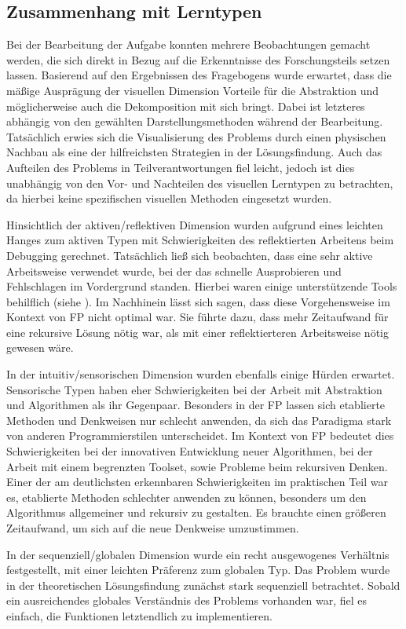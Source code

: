 \subsection{Zusammenhang mit Lerntypen}
Bei der Bearbeitung der Aufgabe konnten mehrere Beobachtungen gemacht werden, die sich direkt in Bezug auf die Erkenntnisse des Forschungsteils setzen lassen. Basierend auf den Ergebnissen des Fragebogens wurde erwartet, dass die mäßige Ausprägung der visuellen Dimension Vorteile für die Abstraktion und möglicherweise auch die Dekomposition mit sich bringt. Dabei ist letzteres abhängig von den gewählten Darstellungsmethoden während der Bearbeitung.
Tatsächlich erwies sich die Visualisierung des Problems durch einen physischen Nachbau als eine der hilfreichsten Strategien in der Lösungsfindung.
Auch das Aufteilen des Problems in Teilverantwortungen fiel leicht, jedoch ist dies unabhängig von den Vor- und Nachteilen des visuellen Lerntypen zu betrachten, da hierbei keine spezifischen visuellen Methoden eingesetzt wurden.

Hinsichtlich der aktiven/reflektiven Dimension wurden aufgrund eines leichten Hanges zum aktiven Typen mit Schwierigkeiten des reflektierten Arbeitens beim Debugging gerechnet. Tatsächlich ließ sich beobachten, dass eine sehr aktive Arbeitsweise verwendet wurde, bei der das schnelle Ausprobieren und Fehlschlagen im Vordergrund standen. Hierbei waren einige unterstützende Tools behilflich (siehe ).
Im Nachhinein lässt sich sagen, dass diese Vorgehensweise im Kontext von FP nicht optimal war. Sie führte dazu, dass mehr Zeitaufwand für eine rekursive Lösung nötig war, als mit einer reflektierteren Arbeitsweise nötig gewesen wäre.

In der intuitiv/sensorischen Dimension wurden ebenfalls einige Hürden erwartet. Sensorische Typen haben eher Schwierigkeiten bei der Arbeit mit Abstraktion und Algorithmen als ihr Gegenpaar. Besonders in der FP lassen sich etablierte Methoden und Denkweisen nur schlecht anwenden, da sich das Paradigma stark von anderen Programmierstilen unterscheidet.
Im Kontext von FP bedeutet dies Schwierigkeiten bei der innovativen Entwicklung neuer Algorithmen, bei der Arbeit mit einem begrenzten Toolset, sowie Probleme beim rekursiven Denken.
Einer der am deutlichsten erkennbaren Schwierigkeiten im praktischen Teil war es, etablierte Methoden schlechter anwenden zu können, besonders um den Algorithmus allgemeiner und rekursiv zu gestalten. Es brauchte einen größeren Zeitaufwand, um sich auf die neue Denkweise umzustimmen.

In der sequenziell/globalen Dimension wurde ein recht ausgewogenes Verhältnis festgestellt, mit einer leichten Präferenz zum globalen Typ. Das Problem wurde in der theoretischen Lösungsfindung zunächst stark sequenziell betrachtet. Sobald ein ausreichendes globales Verständnis des Problems vorhanden war, fiel es einfach, die Funktionen letztendlich zu implementieren.
